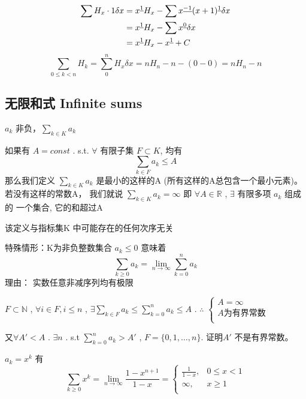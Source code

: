 \begin{align*}
    \sum H_x\cdot 1 \delta x
    &= x^{\underline{1}}H_x - \sum x^{\underline{-1}}(x+1)^{\underline{1}} \delta x\\
    &= x^{\underline{1}}H_x - \sum x^{\underline{0}}\delta x\\
    &= x^{\underline{1}}H_x - x^{\underline{1}} + C
\end{align*}
\begin{equation*}
    \sum_{0\leqslant k<n}H_k = \sum_{0}^{n}H_x\delta x = n H_n - n - (0-0) = n H_n - n
\end{equation*}

\subsection{无限和式 Infinite sums}
$ a_k $ 非负，$ \sum_{k\in K} a_k$ 
\begin{definition}
    如果有 $ A= const $ . s.t. $ \forall $ 有限⼦集 $ F\subset K $, 均有
    \begin{equation*}
        \sum_{k\in F}a_k \leqslant A
    \end{equation*}
    那么我们定义 $ \sum_{k\in K} a_k$ 是最小的这样的A
    (所有这样的A总包含⼀个最小元素)。
    若没有这样的常数A，
    我们就说 $ \sum_{k\in K} a_k = \infty $
    即
    $ \forall A\in \mathbb{R} $ , $ \exists $ 
    有限多项 $ a_k $ 组成的
    ⼀个集合, 它的和超过A
\end{definition}
该定义与指标集K 中可能存在的任何次序⽆关

特殊情形：K为非负整数集合
$ a_k \leqslant 0 $ 意味着
\begin{equation*}
    \sum_{k\geqslant 0} a_k = \lim_{n\rightarrow \infty}\sum_{k=0}^{n}a_k
\end{equation*}
理由： 实数任意非减序列均有极限

$  F \subset \mathbb{N} $ , $ \forall i\in F, i\leqslant n $ , $ \exists \sum_{k\in F}a_k \leqslant \sum_{k=0}^{n}a_k \leqslant A $ . \;
 $ \therefore $  $  \left\{\begin{array}{l}
    A=\infty\\
    A\text{为有界常数}\\
\end{array}\right. $ 

又$ \forall A' < A$ . $ \exists n $ . s.t $ \sum_{k=0}^{n}a_k > A' $ , $ F = \{0,1,\dots,n\} $. 证明$ A' $ 不是有界常数。

\begin{exercise}
    $ a_k = x^k $ 有
    \begin{equation*}
        \sum_{k\geqslant 0}x^k = \lim_{n\rightarrow\infty}\frac{1-x^{n+1}}{1-x} = \left\{\begin{array}{ll}
            \frac{1}{1-x}, & 0\leqslant x<1 \\
            \infty, & x\geqslant 1 \\
        \end{array}\right.
    \end{equation*}
\end{exercise}

